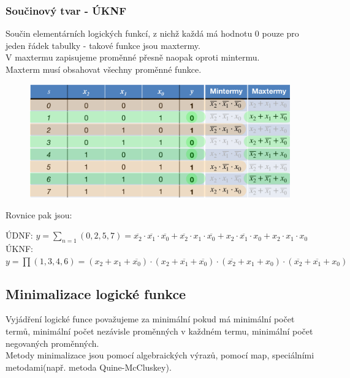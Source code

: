 \subsubsection{Součinový tvar - ÚKNF}
Součin elementárních logických funkcí, z nichž každá má hodnotu 0 pouze pro jeden řádek tabulky - takové funkce jsou maxtermy.\\
V maxtermu zapisujeme proměnné přesně naopak oproti mintermu.\\
Maxterm musí obsahovat všechny proměnné funkce.\\
\newpage
\begin{figure}
    \centering
    \includegraphics*[scale = 0.4]{img/Tvary.png}
\end{figure}
Rovnice pak jsou:
\begin{center}
    ÚDNF: \(y=\sum_{n = 1}(0,2,5,7)= \overline{x_2} \cdot \overline{x_1} \cdot \overline{x_0} + \overline{x_2} \cdot x_1 \cdot \overline{x_0} + x_2 \cdot \overline{x_1} \cdot x_0 + x_2 \cdot x_1 \cdot x_0 \)\\
    ÚKNF: \(y = \prod (1,3,4,6) = (x_2 + x_1 + \overline{x_0}) \cdot (x_2 + \overline{x_1} + \overline{x_0}) \cdot (\overline{x_2} + x_1 + x_0) \cdot (\overline{x_2} + \overline{x_1} + x_0)\)
\end{center}
\subsection{Minimalizace logické funkce}
Vyjádření logické funce považujeme za minimální pokud má minimální počet termů, minimální počet nezávisle proměnných v každném termu, minimální počet negovaných proměnných.\\
Metody minimalizace jsou pomocí algebraických výrazů, pomocí map, speciálními metodami(např. metoda Quine-McCluskey).\\
